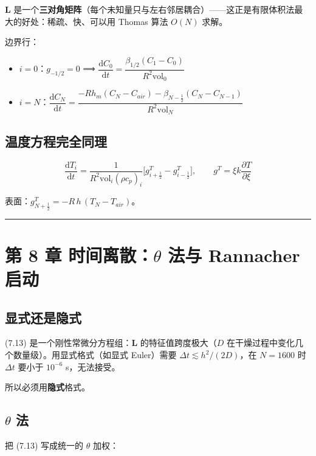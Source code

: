 $\mathbf L$ 是一个\textbf{三对角矩阵}（每个未知量只与左右邻居耦合）——这正是有限体积法最大的好处：稀疏、快、可以用 Thomas 算法 $O(N)$ 求解。


边界行：


\begin{itemize}
\item $i=0$：$g_{-1/2}=0$ ⟹ $\dfrac{\mathrm{d} C_0}{\mathrm{d} t}=\dfrac{\beta_{1/2}(C_1-C_0)}{R^2\mathrm{vol}_0}$
\item $i=N$：$\dfrac{\mathrm{d} C_N}{\mathrm{d} t}=\dfrac{-Rh_m(C_N-C_{air})-\beta_{N-\frac12}(C_N-C_{N-1})}{R^2\mathrm{vol}_N}$
\end{itemize}


\subsection{温度方程完全同理}


\begin{equation}
\frac{\mathrm{d} T_i}{\mathrm{d} t}=\frac{1}{R^2\mathrm{vol}_i(\rho c_p)_i}\Big[g^T_{i+\frac12}-g^T_{i-\frac12}\Big],\qquad
g^T=\xi k\frac{\partial T}{\partial\xi}\tag{7.14}
\end{equation}


表面：$g^T_{N+\frac12}=-R\,h\,(T_N-T_{air})$。


\vspace{1mm}\hrule\vspace{1mm}


\section{第 8 章 时间离散：$\theta$ 法与 Rannacher 启动}


\subsection{显式还是隐式}


(7.13) 是一个刚性常微分方程组：$\mathbf L$ 的特征值跨度极大（$D$ 在干燥过程中变化几个数量级）。用显式格式（如显式 Euler）需要 $\Delta t\lesssim h^2/(2D)$，在 $N=1600$ 时 $\Delta t$ 要小于 $10^{-6}$ s，无法接受。


所以必须用\textbf{隐式}格式。


\subsection{$\theta$ 法}


把 (7.13) 写成统一的 $\theta$ 加权：


